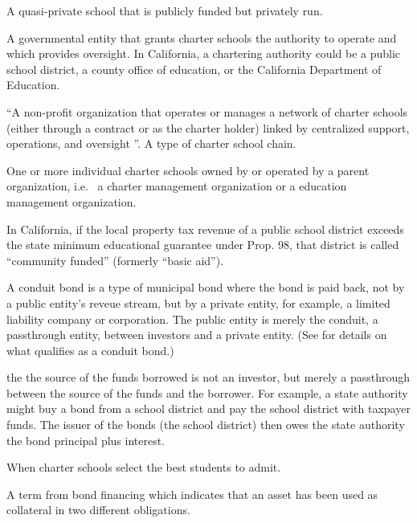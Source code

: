 \begin{description}[nosep]
\medskip\item[charter school] A quasi-private school that is publicly funded but privately run.

\medskip\item[chartering authority] A governmental entity that grants charter schools the authority to operate and which provides oversight. In California, a chartering authority could be a public school district, a county office of education, or the California Department of Education.

\medskip\item[charter management organization (CMO)] ``A non-profit organization that operates or manages a network of charter schools (either through a contract or as the charter holder) linked by centralized support, operations, and oversight \parencite{CDE2021b}''. A type of charter school chain.

\medskip\item[charter school chain] One or more individual charter schools owned by or operated by a parent organization, i.e.  a charter management organization or a education management organization.

\medskip\item[community funded] In California, if the local property tax revenue of a public school district exceeds the state minimum educational guarantee under Prop. 98, that district is called ``community funded'' (formerly ``basic aid'').

\medskip\item[conduit bond] A conduit bond is a type of municipal bond where the bond is paid back, not by a public entity's reveue stream, but by a private entity, for example, a limited liability company or corporation. The public entity is merely the conduit, a passthrough entity, between investors and a private entity. (See  for details on what qualifies as a conduit bond.)

the the source of the funds borrowed is not an investor, but merely a passthrough between the source of the funds and the borrower. For example, a state authority might buy a bond from a school district and pay the school district with taxpayer funds. The issuer of the bonds (the school district) then owes the state authority the bond principal plus interest.

\medskip\item[cream skimming] When charter schools select the best students to admit.

\medskip\item[cross-collateralization] A term from bond financing which indicates that an asset has been used as collateral in two different obligations.


\end{description}
